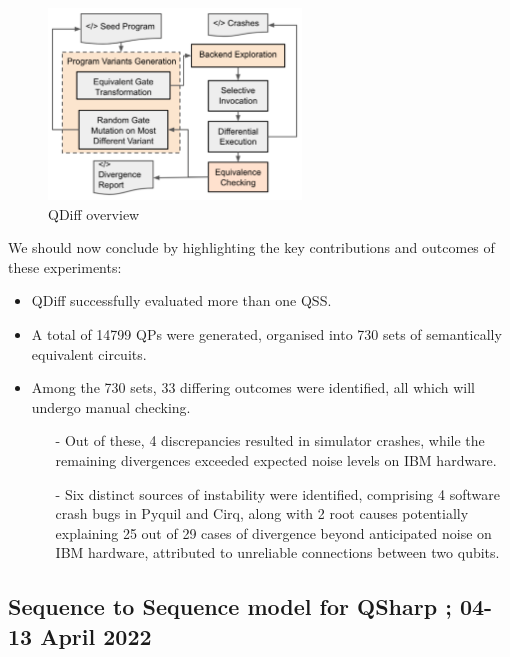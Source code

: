 \begin{itemize}
    \begin{figure}[H]
        \centering
        \includegraphics[width=0.6\textwidth]{TFM/photos/QDiffWorkoverflow.png}
        \caption{QDiff overview \cite{wang2021qdiff}} 
        \label{Fig:QDiffWorkOverflow}
    \end{figure}

    We should now conclude by highlighting the key contributions and outcomes of these experiments:

\begin{itemize}
    \item QDiff successfully evaluated more than one QSS.
    \item A total of 14799 QPs were generated, organised into 730 sets of semantically equivalent circuits.
    \item Among the 730 sets, 33 differing outcomes were identified, all which will undergo manual checking.
    \begin{itemize}
        \item[-] Out of these, 4 discrepancies resulted in simulator crashes, while the remaining divergences exceeded expected noise levels on IBM hardware.
        \item[-] Six distinct sources of instability were identified, comprising 4 software crash bugs in Pyquil and Cirq, along with 2 root causes potentially explaining 25 out of 29 cases of divergence beyond anticipated noise on IBM hardware, attributed to unreliable connections between two qubits.
    \end{itemize}
    
\end{itemize}

\vspace{15pt}
\subsection{Sequence to Sequence model for QSharp ; 04-13 April 2022}


\end{itemize}
